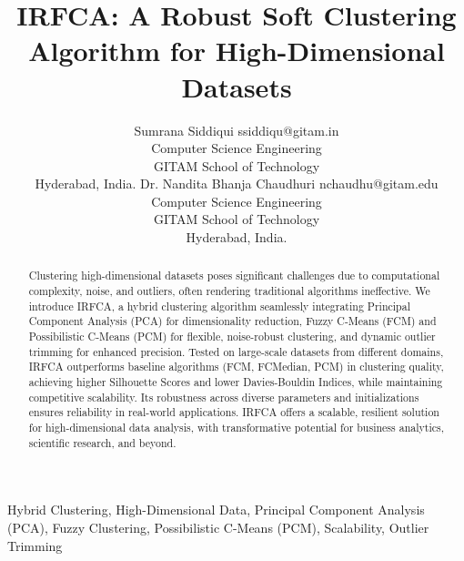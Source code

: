 \documentclass[twoside,11pt]{article}
\begin{document}
\title{IRFCA: A Robust Soft Clustering Algorithm for 
High-Dimensional Datasets}

\author{\name Sumrana Siddiqui \email ssiddiqu@gitam.in \\
       \addr Computer Science Engineering\\ 
       GITAM School of Technology \\
       Hyderabad, India.
       \AND
       \name Dr. Nandita Bhanja Chaudhuri \email nchaudhu@gitam.edu \\
        \addr Computer Science Engineering\\ 
       GITAM School of Technology \\
       Hyderabad, India.}


\maketitle

\begin{abstract}
Clustering high-dimensional datasets poses significant challenges due to computational complexity, noise, and outliers, often rendering traditional algorithms ineffective. We introduce IRFCA, a hybrid clustering algorithm seamlessly integrating Principal Component Analysis (PCA) for dimensionality reduction, Fuzzy C-Means (FCM) and Possibilistic C-Means (PCM) for flexible, noise-robust clustering, and dynamic outlier trimming for enhanced precision. Tested on large-scale datasets from different domains, IRFCA outperforms baseline algorithms (FCM, FCMedian, PCM) in clustering quality, achieving higher Silhouette Scores and lower Davies-Bouldin Indices, while maintaining competitive scalability. Its robustness across diverse parameters and initializations ensures reliability in real-world applications. IRFCA offers a scalable, resilient solution for high-dimensional data analysis, with transformative potential for business analytics, scientific research, and beyond.
\end{abstract}

\begin{keywords}
  Hybrid Clustering, High-Dimensional Data, Principal Component Analysis (PCA), Fuzzy Clustering, Possibilistic C-Means (PCM), Scalability, Outlier Trimming
\end{keywords}
\end{document}
